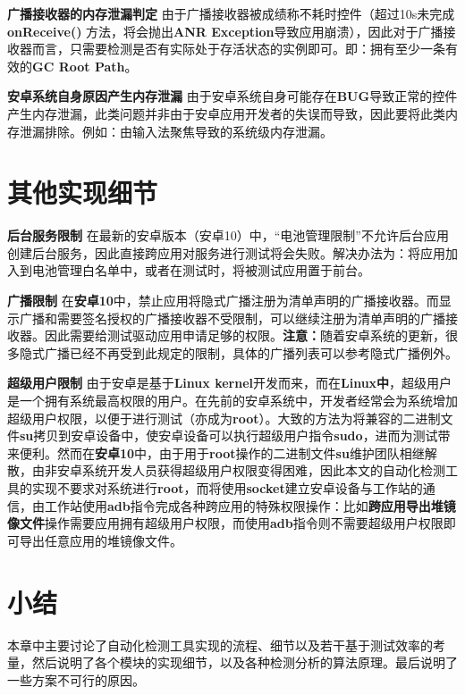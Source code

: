 \textbf{广播接收器的内存泄漏判定 } 由于广播接收器被成绩称不耗时控件（超过10s未完成\textbf{onReceive()} 方法，将会抛出\textbf{ANR Exception}导致应用崩溃），因此对于广播接收器而言，只需要检测是否有实际处于存活状态的实例即可。即：拥有至少一条有效的\textbf{GC Root Path}。

\textbf{安卓系统自身原因产生内存泄漏 } 由于安卓系统自身可能存在\textbf{BUG}导致正常的控件产生内存泄漏，此类问题并非由于安卓应用开发者的失误而导致，因此要将此类内存泄漏排除。例如：由输入法聚焦导致的系统级内存泄漏。

\section{其他实现细节}

\textbf{后台服务限制 }\cite{android-service-limit} 在最新的安卓版本（安卓10）中，“电池管理限制”不允许后台应用创建后台服务，因此直接跨应用对服务进行测试将会失败。解决办法为：将应用加入到电池管理白名单中，或者在测试时，将被测试应用置于前台。

\textbf{广播限制 }\cite{android-receiver-limit} 在\textbf{安卓10}中，禁止应用将隐式广播注册为清单声明的广播接收器。而显示广播和需要签名授权的广播接收器不受限制，可以继续注册为清单声明的广播接收器。因此需要给测试驱动应用申请足够的权限。\textbf{注意：}随着安卓系统的更新，很多隐式广播已经不再受到此规定的限制，具体的广播列表可以参考隐式广播例外\cite{android-receiver-limit-exception}。

\textbf{超级用户限制 } 由于安卓是基于\textbf{Linux kernel}开发而来，而在\textbf{Linux中}，超级用户是一个拥有系统最高权限的用户。在先前的安卓系统中，开发者经常会为系统增加超级用户权限，以便于进行测试（亦成为\textbf{root}）。大致的方法为将兼容的二进制文件\textbf{su}拷贝到安卓设备中，使安卓设备可以执行超级用户指令\textbf{sudo}，进而为测试带来便利。然而在\textbf{安卓10}中，由于用于\textbf{root}操作的二进制文件\textbf{su}维护团队相继解散，由非安卓系统开发人员获得超级用户权限变得困难，因此本文的自动化检测工具的实现不要求对系统进行\textbf{root}，而将使用\textbf{socket}建立安卓设备与工作站的通信，由工作站使用\textbf{adb}指令完成各种跨应用的特殊权限操作：比如\textbf{跨应用导出堆镜像文件}操作需要应用拥有超级用户权限，而使用\textbf{adb}指令则不需要超级用户权限即可导出任意应用的堆镜像文件。
\newline
\section{小结}
本章中主要讨论了自动化检测工具实现的流程、细节以及若干基于测试效率的考量，然后说明了各个模块的实现细节，以及各种检测分析的算法原理。最后说明了一些方案不可行的原因。